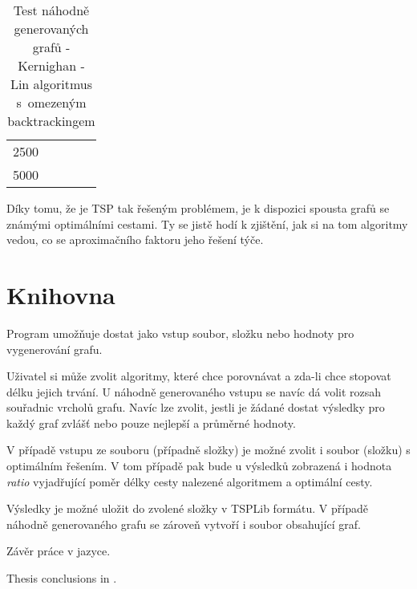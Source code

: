 \documentclass[
  printversion=false,
  joinlists=true,
  glossaries=true,
  figures=true,
  tables=true,
  sourcecodes=false,
  theorems=false,
  bibencoding=utf8,
  language=czech,
  encoding=utf8,
  program=infpvs,
  index=true,
  biblatex=true
]{kidiplom}
\begin{document}
\begin{table}[H]
\begin{tabular}{|c|c|c|c|c|}
2500                   & \multicolumn{1}{c|}{}                        & \multicolumn{1}{c|}{}                         & \multicolumn{1}{c|}{}                      & \multicolumn{1}{c|}{}                       \\
5000                   & \multicolumn{1}{c|}{}                        & \multicolumn{1}{c|}{}                         & \multicolumn{1}{c|}{}                      & \multicolumn{1}{c|}{}                       \\ \hline
\end{tabular}
\caption{Test náhodně generovaných grafů - Kernighan - Lin algoritmus s~omezeným backtrackingem}
\end{table}

Díky tomu, že je TSP tak řešeným problémem, je k dispozici spousta grafů se známými optimálními cestami. Ty se jistě hodí k zjištění, jak si na tom algoritmy vedou, co se aproximačního faktoru jeho řešení týče.

\pagebreak
\section{Knihovna}
Program umožňuje dostat jako vstup soubor, složku nebo hodnoty pro vygenerování grafu.

Uživatel si může zvolit algoritmy, které chce porovnávat a zda-li chce stopovat délku jejich trvání. U náhodně generovaného vstupu se navíc dá volit rozsah souřadnic vrcholů grafu. Navíc lze zvolit, jestli je žádané dostat výsledky pro každý graf zvlášť nebo pouze nejlepší a průměrné hodnoty.

V případě vstupu ze souboru (případně složky) je možné zvolit i soubor (složku) s optimálním řešením. V tom případě pak bude u výsledků zobrazená i hodnota \textit{ratio} vyjadřující poměr délky cesty nalezené algoritmem a optimální cesty.

Výsledky je možné uložit do zvolené složky v TSPLib formátu. V případě náhodně generovaného grafu se zároveň vytvoří i soubor obsahující graf.

\begin{kiconclusions}
Závěr práce v  jazyce.
\end{kiconclusions}

\begin{kiconclusions}[english]
Thesis conclusions in .
\end{kiconclusions}


\end{document}
